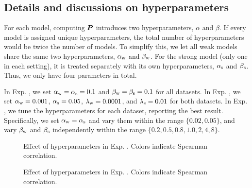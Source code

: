 \subsection{Details and discussions on hyperparameters}\label{apdx: hyperparam}


For each model, computing ${\bm{P}}$ introduces two hyperparameters, $\alpha$ and $\beta$. If every model is assigned unique hyperparameters, the total number of hyperparameters would be twice the number of models. To simplify this, we let all weak models share the same two hyperparameters, $\alpha_{\text{w}}$ and $\beta_{\text{w}}$. For the strong model (only one in each setting), it is treated separately with its own hyperparameters, $\alpha_{\text{s}}$ and $\beta_{\text{s}}$. Thus, we only have four parameters in total. 

In Exp. , we set $\alpha_{\text{w}} = \alpha_{\text{s}} = 0.1$ and $\beta_{\text{w}} = \beta_{\text{s}} = 0.1$ for all datasets. In Exp. , we set $\alpha_{\text{w}} = 0.001$, $\alpha_{\text{s}} = 0.05$, $\lambda_{\text{w}} = 0.0001$, and $\lambda_{\text{s}} = 0.01$ for both datasets. In Exp. , we tune the hyperparameters for each dataset, reporting the best result. Specifically, we set $\alpha_{\text{w}} = \alpha_{\text{s}}$ and vary them within the range $\{0.02, 0.05\}$, and vary $\beta_{\text{w}}$ and $\beta_{\text{s}}$ independently within the range $\{0.2, 0.5, 0.8, 1.0, 2, 4, 8\}$.

\begin{figure}
    \centering
{}
    \caption{Effect of hyperparameters in Exp. . Colors indicate Spearman correlation.}
    \label{fig: exp2_hps}
\end{figure}

\begin{figure}[!t]
    \centering
{}
\hspace{-.4cm}
\hspace{-.4cm}
    \caption{ Effect of hyperparameters in Exp. . Colors indicate Spearman correlation.}
    \label{fig: exp3_hps}
\end{figure}


